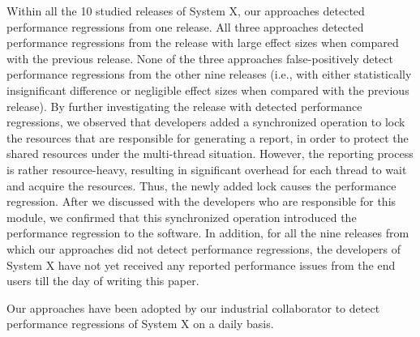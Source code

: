 Within all the 10 studied releases of System X, our approaches detected performance regressions from one release.
All three approaches detected performance regressions from the release with large effect sizes when compared with the previous release.
None of the three approaches false-positively detect performance regressions from the other nine releases (i.e., with either statistically insignificant difference or negligible effect sizes when compared with the previous release). 
By further investigating the release with detected performance regressions, we observed that developers added a synchronized operation to lock the resources that are responsible for generating a report, in order to protect the shared resources under the multi-thread situation. 
However, the reporting process is rather resource-heavy, resulting in significant overhead for each thread to wait and acquire the resources. Thus, the newly added lock causes the performance regression. After we discussed with the developers who are responsible for this module, we confirmed that this synchronized operation introduced the performance regression to the software. 
In addition, for all the nine releases from which our approaches did not detect performance regressions, the developers of System X have not yet received any reported performance issues from the end users till the day of writing this paper.

Our approaches have been adopted by our industrial collaborator to detect performance regressions of System X on a daily basis. 